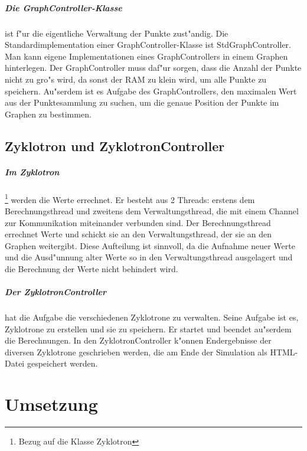 \documentclass[14pt, a4paper]{report}
\begin{document}
\paragraph{Die GraphController-Klasse} ist f"ur die eigentliche Verwaltung der Punkte
zust"andig. Die Standardimplementation einer GraphController-Klasse ist 
StdGraphController. Man kann eigene Implementationen eines GraphControllers in einem
Graphen hinterlegen. Der GraphController muss daf"ur sorgen, dass die Anzahl der Punkte
nicht zu gro"s wird, da sonst der RAM zu klein wird, um alle Punkte zu speichern. 
Au"serdem ist es Aufgabe des GraphControllers, den maximalen Wert aus der Punktesammlung
zu suchen, um die genaue Position der Punkte im Graphen zu bestimmen. 

\section{Zyklotron und ZyklotronController}
\paragraph{Im Zyklotron} \footnote{Bezug auf die Klasse Zyklotron}
werden die Werte errechnet. Er besteht aus 2 Threads: erstens
dem Berechnungsthread und zweitens dem Verwaltungsthread, die mit einem Channel zur
Kommunikation miteinander verbunden sind. 
Der Berechnungsthread errechnet Werte und schickt sie an
den Verwaltungsthread, der sie an den Graphen weitergibt. Diese Aufteilung ist sinnvoll,
da die Aufnahme neuer Werte und die Ausd"unnung alter Werte so in den Verwaltungsthread
ausgelagert und die Berechnung der Werte nicht behindert wird.

\paragraph{Der ZyklotronController} hat die Aufgabe die verschiedenen Zyklotrone zu
verwalten. Seine Aufgabe ist es, Zyklotrone zu erstellen und sie zu speichern. Er startet und beendet
au"serdem die Berechnungen. In den ZyklotronController
k"onnen Endergebnisse der diversen Zyklotrone geschrieben werden, die am Ende der 
Simulation als HTML-Datei gespeichert werden.

\chapter{Umsetzung}
\end{document}
